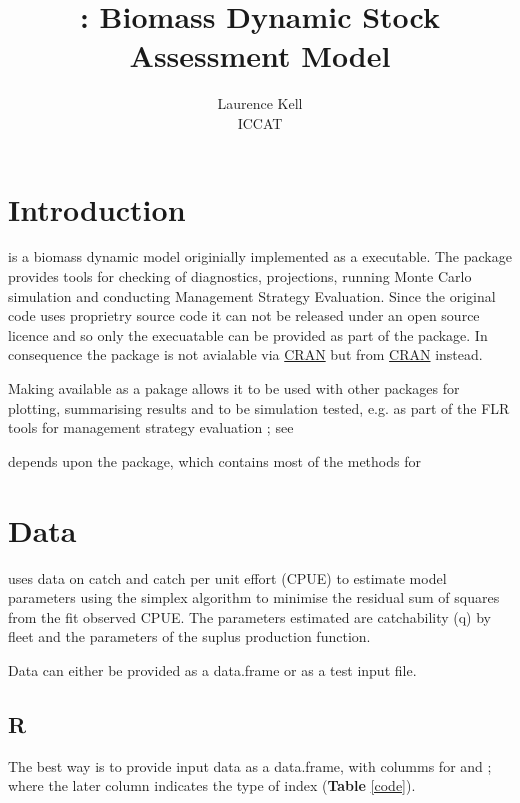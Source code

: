 \documentclass[shortnames,nojss,article]{jss}
\author{Laurence Kell\\ICCAT }
\title{\pkg{aspic}: Biomass Dynamic Stock Assessment Model}
\begin{document}


\newpage\tableofcontents\newpage

\section{Introduction}

 is a biomass dynamic model \citep{prager_suite_1994,prager_aspic-surplus-production_1992} originially implemented as a  executable.
The package provides tools for checking of diagnostics, projections, running Monte Carlo simulation and conducting Management Strategy Evaluation.
Since the original  code uses proprietry source code it can not be released under an open source licence and so only the
 execuatable can be provided as part of the package. In consequence the package is not avialable via \href{}{CRAN} but
from \href{}{CRAN} instead.

Making  available as a pakage allows it to be used with other packages for plotting, summarising results and to be simulation tested, e.g. 
as part of the FLR tools for management strategy evaluation \cite{kell_evaluation_1999}; see 
\citep{kell2013mpalbn,kell2013diagalbn,kell2013diagalbs,kell2013msealbn,kell2013msealbn,kell2013fwdalbn,kell2013diagswon,kell2013diagswos,kell2013fwdswon,kell2013profile,kell2013uncert}

 depends upon the \cite{biodyn} package, which contains most of the methods for  
\section{Data}

 uses data on catch and catch per unit effort (CPUE) to estimate model parameters using the simplex algorithm to minimise the residual 
sum of squares from the fit observed CPUE. The parameters estimated are catchability (q) by fleet and the parameters of the suplus production 
function. 

Data can either be provided as a data.frame or as a test input file. 

\subsection{R}

The best way is to provide input data as a data.frame, with columms for  and ; where the 
later column indicates the type of index (\textbf{Table} \ref{code}).
\end{document}
